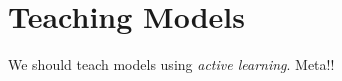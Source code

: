 
\section{Teaching Models}
\label{sec:teaching-models}

We should teach models using \emph{active learning}. Meta!!
